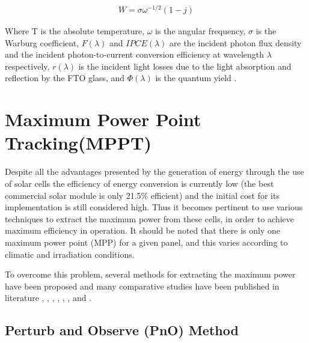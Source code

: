 {   \begin{equation}
     \begin{aligned}
     W = \sigma{\omega^{-1/2}}(1-\textit{j})
     \end{aligned}
    \end{equation}
    
Where T is the absolute temperature, $\omega$ is the angular frequency, $\sigma$ is the Warburg coefficient, $F(\lambda)$ and  $IPCE(\lambda)$ are the incident photon flux density and the incident photon-to-current conversion efficiency at wavelength $\lambda$ respectively, $r(\lambda)$ is the incident light losses due to the light absorption and reflection by the FTO glass, and $\Phi(\lambda)$ is the quantum yield \cite{yong2008modeling}.\newline

  






\section{Maximum Power Point Tracking(MPPT)}


Despite all the advantages presented by the generation of energy through the use of solar cells the efficiency of energy conversion is currently low (the best commercial solar module is only 21.5\% efficient) and the initial cost for its implementation is still considered high. Thus it becomes pertinent to use various techniques to extract the maximum power from these cells, in order to achieve maximum efficiency in operation. It should be noted that there is only one maximum power point (MPP) for a given panel, and this varies according to climatic and irradiation conditions\cite{eltawil2013mppt}.

To overcome this problem, several methods for extracting the maximum power have been proposed and many comparative studies have been published in literature  \cite{chu2009robust}, \cite{clark2006power}, \cite{eltawil2013mppt}, \cite{esram2007comparison}, \cite{faranda2008energy}, \cite{houssamo2013experimental}, \cite{ngan2011study} and \cite{reza2013classification}. 

\subsection{Perturb and Observe (PnO) Method } \label{sec:pno_sec}


}
